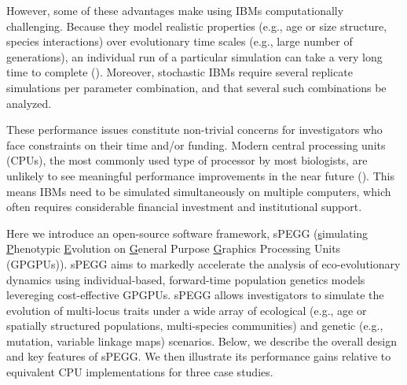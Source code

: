 \documentclass[1p,numbered]{article}
\begin{document}
\begin{linenumbers}
However, some of these advantages make using IBMs computationally challenging. Because they model realistic properties (e.g., age or size structure, species interactions) over evolutionary time scales (e.g., large number of generations), an individual run of a particular simulation can take a very long time to complete (\citealt{deangelis05}). Moreover, stochastic IBMs require several replicate simulations per parameter combination, and that several such combinations be analyzed. 

These performance issues constitute non-trivial concerns for investigators who face constraints on their time and/or funding. Modern central processing units (CPUs), the most commonly used type of processor by most biologists, are unlikely to see meaningful performance improvements in the near future (\citealt{fuller11}). This means IBMs need to be simulated simultaneously on multiple computers, which often requires considerable financial investment and institutional support.

Here we introduce an open-source software framework, sPEGG (\underline{s}imulating \underline{P}henotypic \underline{E}volution on \underline{G}eneral Purpose \underline{G}raphics Processing Units (GPGPUs)). sPEGG aims to markedly accelerate the analysis of eco-evolutionary dynamics using individual-based, forward-time population genetics models levereging cost-effective GPGPUs. sPEGG allows investigators to simulate the evolution of multi-locus traits under a wide array of ecological (e.g., age or spatially structured populations, multi-species communities) and genetic (e.g., mutation, variable linkage maps) scenarios. Below, we describe the overall design and key features of sPEGG. We then illustrate its performance gains relative to equivalent CPU implementations for three case studies. 


\end{linenumbers}
\end{document}
